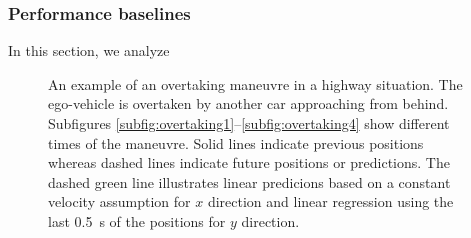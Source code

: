 \subsubsection{Performance baselines}
In this section, we analyze
\begin{figure}[t!]
	\centering
	
	\caption{An example of an overtaking maneuvre in a highway situation. The ego-vehicle is overtaken by another car approaching from behind. Subfigures \ref{subfig:overtaking1}--\ref{subfig:overtaking4} show different times of the maneuvre. Solid lines indicate previous positions whereas dashed lines indicate future positions or predictions. The dashed green line illustrates linear predicions based on a constant velocity assumption for $x$ direction and linear regression using the last \SI{0.5}{\second} of the positions for $y$ direction.} \label{fig:overtaking1}
\end{figure}	
